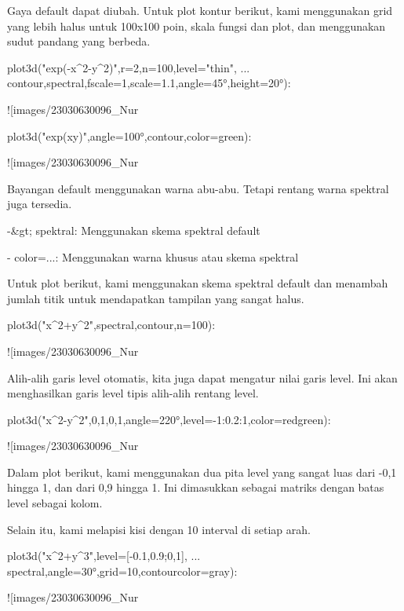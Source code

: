 \documentclass{article}
\begin{document}
Gaya default dapat diubah. Untuk plot kontur berikut, kami menggunakan
grid yang lebih halus untuk 100x100 poin, skala fungsi dan plot, dan
menggunakan sudut pandang yang berbeda.


\>plot3d("exp(-x^2-y^2)",r=2,n=100,level="thin", ...  
\>    \>contour,\>spectral,fscale=1,scale=1.1,angle=45°,height=20°):


![images/23030630096_Nur%

\>plot3d("exp(x\*y)",angle=100°,\>contour,color=green):


![images/23030630096_Nur%

Bayangan default menggunakan warna abu-abu. Tetapi rentang warna
spektral juga tersedia.


-&gt; spektral: Menggunakan skema spektral default


- color=...: Menggunakan warna khusus atau skema spektral


Untuk plot berikut, kami menggunakan skema spektral default dan
menambah jumlah titik untuk mendapatkan tampilan yang sangat halus.


\>plot3d("x^2+y^2",\>spectral,\>contour,n=100):


![images/23030630096_Nur%

Alih-alih garis level otomatis, kita juga dapat mengatur nilai garis
level. Ini akan menghasilkan garis level tipis alih-alih rentang
level.


\>plot3d("x^2-y^2",0,1,0,1,angle=220°,level=-1:0.2:1,color=redgreen):


![images/23030630096_Nur%

Dalam plot berikut, kami menggunakan dua pita level yang sangat luas
dari -0,1 hingga 1, dan dari 0,9 hingga 1. Ini dimasukkan sebagai
matriks dengan batas level sebagai kolom.


Selain itu, kami melapisi kisi dengan 10 interval di setiap arah.


\>plot3d("x^2+y^3",level=[-0.1,0.9;0,1], ...  
\>     \>spectral,angle=30°,grid=10,contourcolor=gray):


![images/23030630096_Nur%
\end{document}
